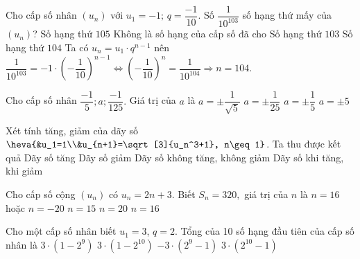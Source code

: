 \begin{ex}%
Cho cấp số nhân $( u_n )$ với $u_1=-1;\,q=\dfrac{-1}{10}$. Số $\dfrac{1}{10^{103}}$ số hạng thứ mấy của $( u_n )$?
\choice
{ Số hạng thứ $105$}
{ Không là số hạng của cấp số đã cho}
{ Số hạng thứ $103$}
{\True Số hạng thứ $104$}
Ta có $u_n=u_1\cdot q^{n-1}$ nên $\dfrac{1}{10^{103}}=-1\cdot \left(-\dfrac{1}{10}\right)^{n-1}\Leftrightarrow (-\dfrac{1}{10})^n=\dfrac{1}{10^{104}}\Rightarrow n=104.$
\loigiai{

}
\end{ex}

\begin{ex}%
Cho cấp số nhân $\dfrac{-1}{5} ; a ; \dfrac{-1}{125} .$ Giá trị của $a$ là
\choice
{$a=\pm \dfrac{1}{\sqrt{5}}$}
{\True $a=\pm \dfrac{1}{25}$}
{$a=\pm \dfrac{1}{5}$}
{$a=\pm 5$}
\end{ex}

\begin{ex}%
Xét tính tăng, giảm của dãy số  $ \heva{&u_1=1\\&u_{n+1}=\sqrt[3]{u_n^3+1}, n\geq 1} $. Ta thu được kết quả
\choice
{\True Dãy số tăng}
{Dãy số giảm}
{Dãy số không tăng, không giảm}
{Dãy số khi tăng, khi giảm}
\end{ex}

\begin{ex}%
Cho cấp số cộng $\left(u_n\right)$ có $u_n=2n+3$. Biết $S_n=320,$ giá trị của $n$ là
\choice
{$n=16$ hoặc $n=-20$}
{$n=15$}
{$n=20$}
{\True $n=16$}
\end{ex}

\begin{ex}%
Cho một cấp số nhân biết $u_1=3$, $q=2$. Tổng của 10 số hạng đầu tiên của cấp số nhân là
\choice
{$3\cdot \left( 1-2^9 \right)$}
{$3\cdot\left( 1-{2^{10}} \right)$}
{$-3\cdot\left( 2^9-1 \right)$}
{\True $3\cdot\left( {2^{10}}-1 \right)$}
\end{ex}


